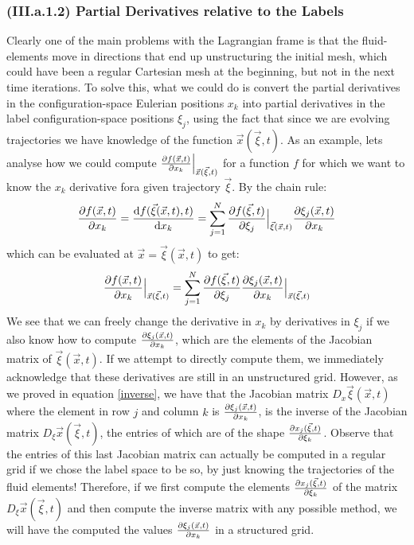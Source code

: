 \documentclass[11pt, a4paper]{article} %
\begin{document}
\subsubsection*{(III.a.1.2) Partial Derivatives relative to the Labels}
Clearly one of the main problems with the Lagrangian frame is that the fluid-elements move in directions that end up unstructuring the initial mesh, which could have been a regular Cartesian mesh at the beginning, but not in the next time iterations. To solve this, what we could do is convert the partial derivatives in the configuration-space Eulerian positions $x_k$ into partial derivatives in the label configuration-space positions $\xi_j$, using the fact that since we are evolving trajectories we have knowledge of the function $\vec{x}(\vec{\xi},t)$. As an example, lets analyse how we could compute $\pdv{f(\vec{x},t)}{x_k}\Big\rvert_{\vec{x}(\vec{\xi},t)}$ for a function $f$ for which we want to know the $x_k$ derivative fora given trajectory $\vec{\xi}$. By the chain rule:
\begin{equation}
\pdv{f(\vec{x},t)}{x_k}=\dv{f(\vec{\xi}(\vec{x},t),t)}{x_k}=\sum_{j=1}^N \pdv{f(\vec{\xi},t)}{\xi_j}\Big\rvert_{\vec{\xi}(\vec{x},t)} \pdv{\xi_j(\vec{x},t)}{x_k}
\end{equation}
which can be evaluated at $\vec{x}=\vec{\xi}(\vec{x},t)$ to get:
\begin{equation}
\pdv{f(\vec{x},t)}{x_k}\Big\rvert_{\vec{x}(\vec{\xi},t)}=\sum_{j=1}^N \pdv{f(\vec{\xi},t)}{\xi_j} \pdv{\xi_j(\vec{x},t)}{x_k}\Big\rvert_{\vec{x}(\vec{\xi},t)}
\end{equation}
We see that we can freely change the derivative in $x_k$ by derivatives in $\xi_j$ if we also know how to compute $\pdv{\xi_j(\vec{x},t)}{x_k}$, which are the elements of the Jacobian matrix of $\vec{\xi}(\vec{x},t)$. If we attempt to directly compute them, we immediately acknowledge that these derivatives are still in an unstructured grid. However, as we proved in equation \eqref{inverse}, we have that the Jacobian matrix $D_x \vec{\xi}(\vec{x},t)$ where the element in row $j$ and column $k$ is $\pdv{\xi_j(\vec{x},t)}{x_k}$, is the inverse of the Jacobian matrix $D_\xi \vec{x}(\vec{\xi},t)$, the entries of which are of the shape $\pdv{x_j(\vec{\xi},t)}{\xi_k}$. Observe that the entries of this last Jacobian matrix can actually be computed in a regular grid if we chose the label space to be so, by just knowing the trajectories of the fluid elements! Therefore, if we first compute the elements $\pdv{x_j(\vec{\xi},t)}{\xi_k}$ of the matrix $D_\xi \vec{x}(\vec{\xi},t)$ and then compute the inverse matrix with any possible method, we will have the computed the values $\pdv{\xi_j(\vec{x},t)}{x_k}$ in a structured grid.\\
\end{document}
